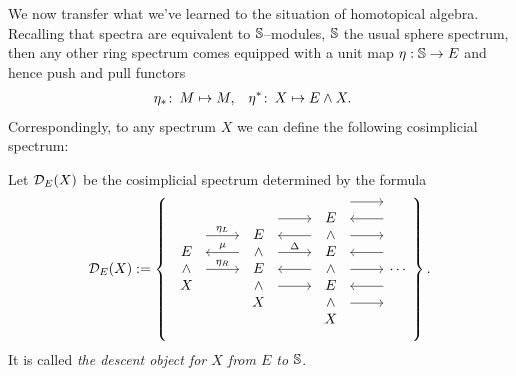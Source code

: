 We now transfer what we've learned to the situation of homotopical algebra.  Recalling that spectra are equivalent to $\S$--modules, $\S$ the usual sphere spectrum, then any other ring spectrum comes equipped with a unit map $\eta: \S \to E$ and hence push and pull functors
\begin{align*}
\eta_*\co M & \mapsto M, &
\eta^*\co X & \mapsto E \sm X.
\end{align*}
Correspondingly, to any spectrum $X$ we can define the following cosimplicial spectrum:
\begin{definition}
Let $\sheaf D_E(X)$ be the cosimplicial spectrum determined by the formula
\[\mathcal{D}_E(X) := \left\{
\begin{tikzcd}
\begin{array}{c} E \\ \sm \\ X \end{array} \arrow[leftarrow, shift left=\baselineskip]{r}{\mu} \arrow[shift left=(2*\baselineskip)]{r}{\eta_L} \arrow{r}{\eta_R} &
\begin{array}{c} E \\ \sm \\ E \\ \sm \\ X \end{array} \arrow[shift left=(3*\baselineskip)]{r} \arrow[leftarrow, shift left=(2*\baselineskip)]{r} \arrow[shift left=\baselineskip]{r}{\Delta} \arrow[leftarrow]{r} \arrow[shift right=\baselineskip]{r} &
\begin{array}{c} E \\ \sm \\ E \\ \sm \\ E \\ \sm \\ X \end{array} \arrow[shift left=(4*\baselineskip)]{r} \arrow[leftarrow, shift left=(3*\baselineskip)]{r} \arrow[shift left=(2*\baselineskip)]{r} \arrow[leftarrow, shift left=\baselineskip]{r} \arrow{r} \arrow[leftarrow, shift right=\baselineskip]{r} \arrow[shift right=(2*\baselineskip)]{r} &
\cdots
\end{tikzcd}
\right\}.\]
It is called \textit{the descent object for $X$ from $E$ to $\S$}.
\end{definition}

